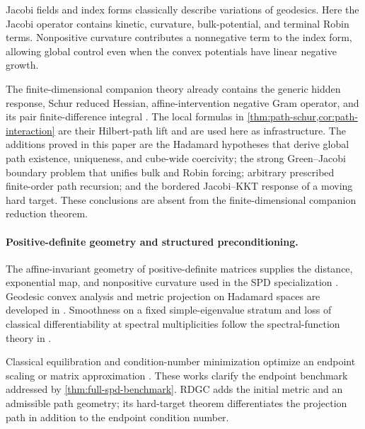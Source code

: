 Jacobi fields and index forms classically describe variations of geodesics.
Here the Jacobi operator contains kinetic, curvature, bulk-potential, and
terminal Robin terms.  Nonpositive curvature contributes a nonnegative term
to the index form, allowing global control even when the convex potentials
have linear negative growth.

The finite-dimensional companion theory already contains the generic hidden
response, Schur reduced Hessian, affine-intervention negative Gram operator,
and its pair finite-difference integral
\cite{li2026optimizationgeometrodynamics}.  The local formulas in
\cref{thm:path-schur,cor:path-interaction} are their Hilbert-path lift and are
used here as infrastructure.  The additions proved in this paper are the
Hadamard hypotheses that derive global path existence, uniqueness, and
cube-wide coercivity; the strong Green--Jacobi boundary problem that unifies
bulk and Robin forcing; arbitrary prescribed finite-order path recursion; and
the bordered Jacobi--KKT response of a moving hard target.  These conclusions
are absent from the finite-dimensional companion reduction theorem.

\paragraph{Positive-definite geometry and structured preconditioning.}
The affine-invariant geometry of positive-definite matrices supplies the
distance, exponential map, and nonpositive curvature used in the SPD
specialization
\cite{bhatia2007positive,pennec2006riemannian,higham2008functions}.
Geodesic convex analysis and metric projection on Hadamard spaces are
developed in
\cite{sra2015conic,lim2004best,bacak2014convex}.
Smoothness on a fixed simple-eigenvalue stratum and loss of classical
differentiability at spectral multiplicities follow the spectral-function
theory in \cite{lewis1996derivatives,lewis2001twice,lewis2003eigenvalue}.

Classical equilibration and condition-number minimization optimize an endpoint
scaling or matrix approximation
\cite{vandersluis1969equilibration,marechal2009optimizing,
lu2011minimizing,diamond2016stochastic,tanaka2013positive,
qu2024optimal,dogan2025geodesicpreconditioning}.  These works clarify the
endpoint benchmark addressed by \cref{thm:full-spd-benchmark}.  RDGC adds the
initial metric and an admissible path geometry; its hard-target theorem
differentiates the projection path in addition to the endpoint condition
number.

